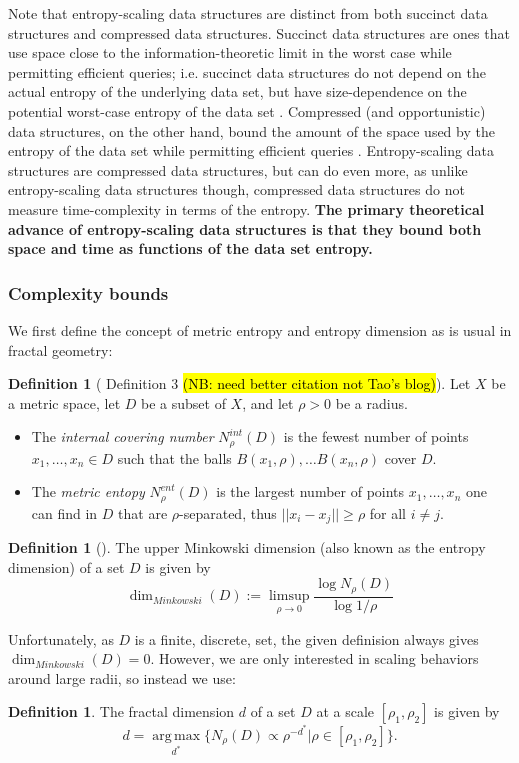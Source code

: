 \documentclass[review,preprint,12pt]{elsarticle}
\renewcommand{\cite}{\citep} %
\theoremstyle{definition}
\newtheorem{definition}[theorem]{Definition}
\theoremstyle{remark}
\numberwithin{equation}{section}
\begin{document}
Note that entropy-scaling data structures are distinct from both succinct data structures and compressed data structures.
Succinct data structures are ones that use space close to the information-theoretic limit in the worst case while permitting efficient queries; i.e.
succinct data structures do not depend on the actual entropy of the underlying data set, but have size-dependence on the potential worst-case entropy of the data set \cite{jacobson1988succinct}.
Compressed (and opportunistic) data structures, on the other hand, bound the amount of the space used by the entropy of the data set while permitting efficient queries \cite{grossi2005compressed, ferragina2000opportunistic}.
Entropy-scaling data structures are compressed data structures, but can do even more, as
unlike entropy-scaling data structures though, compressed data structures do not measure time-complexity in terms of the entropy.
\textbf{The primary theoretical advance of entropy-scaling data structures is that they bound both space and time as functions of the data set entropy.}

\subsubsection{Complexity bounds}
We first define the concept of metric entropy and entropy dimension as is usual in fractal geometry:
\begin{definition}[\cite{tao2014metric} Definition 3 \hl{(NB: need better citation not Tao's blog)}]
    Let $X$ be a metric space, let $D$ be a subset of $X$, and let $\rho>0$ be a radius.
    \begin{itemize}
        \item The \textit{internal covering number} $N_\rho^{int}(D)$ is the fewest number of points $x_1, \ldots, x_n \in D$ such that the balls $B(x_1,\rho), \ldots B(x_n,\rho)$ cover $D$.
        \item The \textit{metric entopy} $N_\rho^{ent}(D)$ is the largest number of points $x_1, \ldots, x_n$ one can find in $D$ that are $\rho$-separated, thus $||x_i - x_j|| \ge \rho$ for all $i \ne j$.
    \end{itemize}
\end{definition}
\begin{definition}[\cite{falconer2013fractal}]
    The upper Minkowski dimension (also known as the entropy dimension) of a set $D$ is given by 
\[
    \dim_{Minkowski}(D) := \limsup_{\rho \to 0} \frac{\log N_\rho(D)}{\log 1/\rho}
\]
\end{definition}
Unfortunately, as $D$ is a finite, discrete, set, the given definision always gives $\dim_{Minkowski}(D) = 0$.
However, we are only interested in scaling behaviors around large radii, so instead we use:
\begin{definition}
    The fractal dimension $d$ of a set $D$ at a scale $[\rho_1,\rho_2]$ is given by
    \[
        d = \operatorname*{arg\,max}_{d^*} \{ N_\rho(D) \propto \rho^{-d^*} | \rho \in [\rho_1,\rho_2] \}.
    \]
\end{definition}
\end{document}
